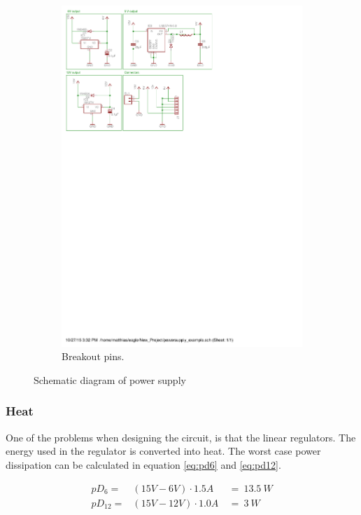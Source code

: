 \begin{figure}[H]
\begin{subfigure}{0.4\linewidth}
\includegraphics[scale=0.8,trim={5.3cm 18.5cm 10.4cm 6.0cm},clip]{img/powersupply.pdf}
\caption{Breakout pins.}
\label{fig::sch_power_pins}
\end{subfigure}
\caption{Schematic diagram of power supply}
\label{fig::sch_power}
\end{figure}


\subsubsection{Heat}
One of the problems when designing the circuit, is that the linear regulators.
The energy used in the regulator is converted into heat.
The worst case power dissipation can be calculated in equation \ref{eq:pd6} and \ref{eq:pd12}.

\begin{eqnarray}
pD_{6}  =& (15V - 6V) \cdot 1.5A\ &=\ 13.5\ W \label{eq:pd6}\\
pD_{12} =& (15V - 12V)\cdot 1.0A\ &=\ 3\ W \label{eq:pd12}
\end{eqnarray}

